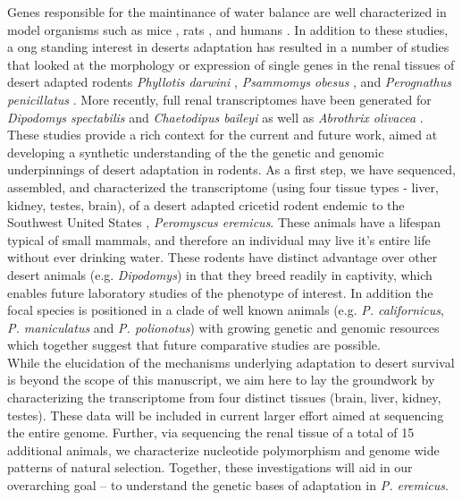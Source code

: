 \documentclass[11pt]{article}
\begin{document}
Genes responsible for the maintinance of water balance are well characterized in model organisms such as mice \cite{Tatum:2009kp}, rats \cite{Romero:2007fs,Rojek:2006dg,NIELSEN:1995uq}, and humans \cite{Mobasheri:2007tt,Bedford:2003wa,NIELSEN:1999vg}. In addition to these studies, a ong standing interest in deserts adaptation has resulted in a number of studies that looked at the morphology or expression of single genes in the renal tissues of desert adapted rodents \textit{Phyllotis darwini} \cite{Gallardo:2005fm}, \textit{Psammomys obesus} \cite{Kaissling:1975uu}, and \textit{Perognathus penicillatus} \cite{Altschuler:1979du}. More recently, full renal transcriptomes have been generated for \textit{Dipodomys spectabilis} and \textit{Chaetodipus baileyi} \cite{Marra:2014de} as well as \textit{Abrothrix olivacea} \cite{Giorello:2014iv}. \\

These studies provide a rich context for the current and future work, aimed at developing a synthetic understanding of the the genetic and genomic underpinnings of desert adaptation in rodents. As a first step, we have sequenced, assembled, and characterized the transcriptome (using four tissue types - liver, kidney, testes, brain), of a desert adapted cricetid rodent endemic to the Southwest United States \cite{Veal:2001vp}, \textit{Peromyscus eremicus}. These animals have a lifespan typical of small mammals, and therefore an individual may live it's entire life without ever drinking water. These rodents have distinct advantage over other desert animals (e.g. \textit{Dipodomys}) in that they breed readily in captivity, which enables future laboratory studies of the phenotype of interest. In addition the focal species is positioned in a clade of well known animals (e.g. \textit{P. californicus}, \textit{P. maniculatus} and \textit{P. polionotus}) \cite{Bradley:2007jo} with growing genetic and genomic resources \cite{Shorter:2014kw,Panhuis:2011co,Shorter:2012ib} which together suggest that future comparative studies are possible. \\


While the elucidation of the mechanisms underlying adaptation to desert survival is beyond the scope of this manuscript, we aim here to lay the groundwork by characterizing the transcriptome from four distinct tissues (brain, liver, kidney, testes). These data will be included in current larger effort aimed at sequencing the entire genome. Further, via sequencing the renal tissue of a total of 15 additional animals, we characterize nucleotide polymorphism and genome wide patterns of natural selection. Together, these investigations will aid in our overarching goal -- to understand the genetic bases of adaptation in \textit{P. eremicus}.
\end{document}

